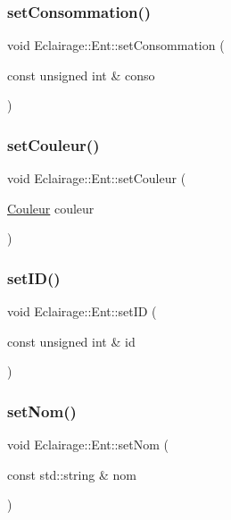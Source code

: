 \subsubsection{\texorpdfstring{set\+Consommation()}{setConsommation()}}
{\footnotesize\ttfamily void Eclairage\+::\+Ent\+::set\+Consommation (\begin{DoxyParamCaption}\item[{const unsigned int \&}]{conso }\end{DoxyParamCaption})}

\mbox{\label{classEclairage_1_1Ent_a5f1a309d7e9c51a921a9ffcf8f6343f7}} 
\subsubsection{\texorpdfstring{set\+Couleur()}{setCouleur()}}
{\footnotesize\ttfamily void Eclairage\+::\+Ent\+::set\+Couleur (\begin{DoxyParamCaption}\item[{\hyperlink{Couleur_8h_aa304d0ca681f782b1d7735da33037dd7}{Couleur}}]{couleur }\end{DoxyParamCaption})}

\mbox{\label{classEclairage_1_1Ent_a927ff132e908bb3e68dab254f6c2ac2d}} 
\subsubsection{\texorpdfstring{set\+I\+D()}{setID()}}
{\footnotesize\ttfamily void Eclairage\+::\+Ent\+::set\+ID (\begin{DoxyParamCaption}\item[{const unsigned int \&}]{id }\end{DoxyParamCaption})}

\mbox{\label{classEclairage_1_1Ent_a348836d7b3c2f69f376d63c84ace8e3e}} 
\subsubsection{\texorpdfstring{set\+Nom()}{setNom()}}
{\footnotesize\ttfamily void Eclairage\+::\+Ent\+::set\+Nom (\begin{DoxyParamCaption}\item[{const std\+::string \&}]{nom }\end{DoxyParamCaption})}

